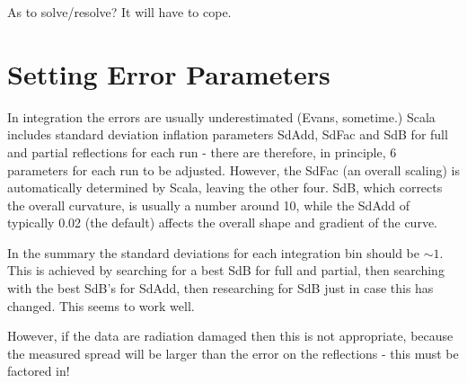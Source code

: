 \documentclass[a4paper, 11pt]{article}
\begin{document}
As to solve/resolve? It will have to cope.

\section{Setting Error Parameters}

In integration the errors are usually underestimated (Evans, sometime.) 
Scala includes standard deviation inflation parameters SdAdd, SdFac and SdB
for full and partial reflections for each run - there are therefore, in 
principle, 6 parameters for each run to be adjusted. However, the SdFac
(an overall scaling) is automatically determined by Scala, leaving the 
other four. SdB, which corrects the overall curvature, is usually a number
around 10, while the SdAdd of typically 0.02 (the default) affects the 
overall shape and gradient of the curve.

In the summary the standard deviations for each integration bin should 
be $\sim 1$. This is achieved by searching for a best SdB for full and
partial, then searching with the best SdB's for SdAdd, then researching for 
SdB just in case this has changed. This seems to work well.

However, if the data are radiation damaged then this is not appropriate,
because the measured spread will be larger than the error on the reflections - 
this must be factored in!
\end{document}
